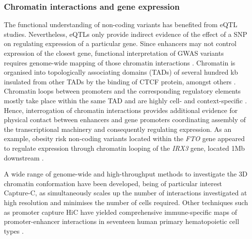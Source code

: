 \subsubsection{Chromatin interactions and gene expression}
The functional understanding of non-coding variants has benefited from eQTL studies. Nevertheless, eQTLs only provide indirect evidence of the effect of a SNP on regulating expression of a particular gene. Since enhancers may not control expression of the closest gene, functional interpretation of GWAS variants requires genome-wide mapping of those chromatin interactions \parencite{Smemo2014}.  Chromatin is organised into topologically associating domains (TADs) of several hundred kb insulated from other TADs by the binding of CTCF protein, amongst others \parencite{Nora2017}. Chromatin loops between promoters and the corresponding regulatory elements mostly take place within the same TAD and are highly cell- and context-specific \parencite{Smith2016}. Hence, interrogation of chromatin interactions provides additional evidence for physical contact between enhancers and gene promoters coordinating assembly of the transcriptional machinery and consequently regulating expression. As an example, obesity risk non-coding variants located within the \textit{FTO} gene appeared to regulate expression through chromatin looping of the \textit{IRX3} gene, located 1Mb downstream \parencite{Smemo2014}.

A wide range of genome-wide and high-throughput methods to investigate the 3D chromatin conformation have been developed, being of particular interest Capture-C, as simultaneously scales up the number of interactions investigated at high resolution and minimises the number of cells required\parencite{Davies2017,Oudelaar2017}. Other techniques such as promoter capture HiC have yielded comprehensive immune-specific maps of promoter-enhancer interactions in seventeen human primary hematopoietic cell types \parencite{Javierre2016}. %



